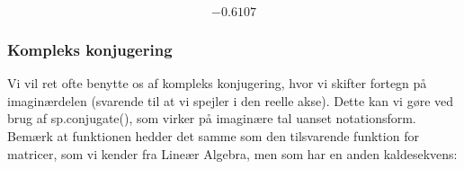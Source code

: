 \documentclass[letterpaper,10pt,english]{jupyterBook}
\begin{document}
\begin{sphinxVerbatim}[commandchars=\\\{\}]
\end{sphinxVerbatim}
\begin{equation*}
\begin{split}\displaystyle -0.6107\end{split}
\end{equation*}

\subsubsection{Kompleks konjugering}
\label{\detokenize{notebooks/sympy/Notebook_kompleks:kompleks-konjugering}}
Vi vil ret ofte benytte os af kompleks konjugering, hvor vi skifter fortegn på imaginærdelen (svarende til at vi spejler i den reelle akse). Dette kan vi gøre ved brug af sp.conjugate(), som virker på imaginære tal uanset notationsform. Bemærk at funktionen hedder det samme som den tilsvarende funktion for matricer, som vi kender fra Lineær Algebra, men som har en anden kaldesekvens:
\end{document}
